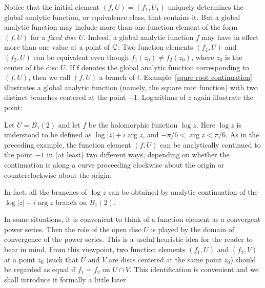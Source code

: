 Notice that the initial element $(f,U)=(f_1,U_1)$ uniquely determines the global analytic function, or equivalence class, that contains it. But a global analytic function may include more than one function element of the form $(f,U)$ for a \textit{fixed disc} $U$. Indeed, a global analytic function $f$ may have in effect more than one value at a point of $\mathbb{C}$: Two function elements $(f_1,U)$ and $(f_2,U)$ can be equivalent even though $f_1(z_0)\neq f_2(z_0)$, where $z_0$ is the center of the disc $U$. If $\mathsf{f}$ denotes the global analytic function corresponding to $(f,U)$, then we call $(f,U)$ a branch of $\mathsf{f}$. Example~\ref{squre root continuation} illustrates a global analytic function (namely, the square root function) with two distinct branches centered at the point $-1$. Logarithms of $z$ again illustrate the point:
\begin{example}
Let $U=B_{1}(2)$ and let $f$ be the holomorphic function $\log z$. Here $\log z$ is understood to be defined as $\log|z|+i\arg z$, and $-\pi/6<\arg z<\pi/6$. As in the preceding example, the function element $(f,U)$ can be analytically continued to the point $-1$ in (at least) two different
ways, depending on whether the continuation is along a curve proceeding clockwise about the origin or counterclockwise about the origin.\par
In fact, all the branches of $\log z$ can be obtained by analytic continuation of the $\log|z|+i\arg z$ branch on $B_1(2)$.
\end{example}
In some situations, it is convenient to think of a function element as a convergent power series. Then the role of the open disc $U$ is played by the domain of convergence of the power series. This is a useful heuristic idea for the reader to bear in mind. From this viewpoint, two function elements $(f_1,U)$ and $(f_2,V)$ at a point $z_0$ (such that $U$ and $V$ are discs centered at the same point $z_0$) should be regarded as equal if $f_1=f_2$ on $U\cap V$. This identification is convenient and we shall introduce it formally a little later.
